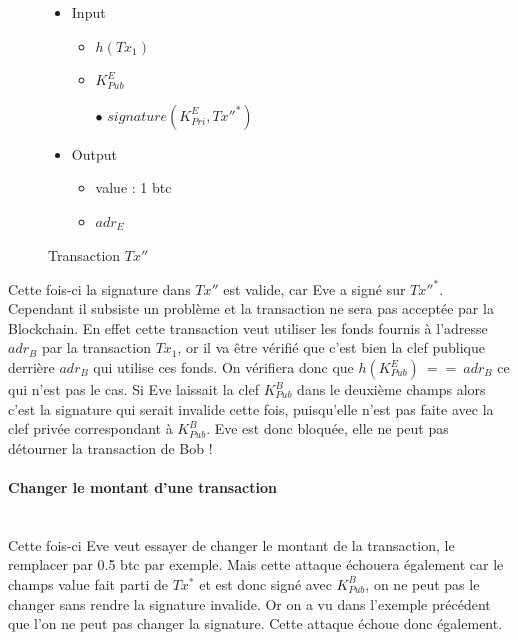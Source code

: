 \documentclass[11pt,a4paper]{article}
\begin{document}
\begin{figure}[H]
\begin{itemize}
\renewcommand{\labelitemi}{$\bullet$}
\renewcommand{\labelitemii}{$\star$}

\item Input
\begin{itemize}
\item $h(Tx_1)$
\item $K_{Pub}^{E}$
\item[$\bullet$] $signature(K_{Pri}^{E}, Tx''^*)$
\end{itemize}

\item Output
\begin{itemize}
\item value : 1 btc
\item $adr_E$
\end{itemize}

\end{itemize}

\caption{Transaction $Tx''$}
\end{figure}

Cette fois-ci la signature dans $Tx''$ est valide, car Eve a signé sur 
$Tx''^*$. Cependant il subsiste un problème et la transaction ne sera pas acceptée par la Blockchain. En effet cette transaction veut utiliser les fonds fournis à l'adresse $adr_B$ par la transaction $Tx_1$, or il va être vérifié que c'est bien la clef publique derrière $adr_B$ qui utilise ces fonds. On vérifiera donc que $h(K_{Pub}^{E}) ~==~ adr_B$ ce qui n'est pas le cas. Si Eve laissait la clef $K_{Pub}^{B}$ dans le deuxième champs alors c'est la signature qui serait invalide cette fois, puisqu'elle n'est pas faite avec la clef privée correspondant à $K_{Pub}^{B}$. Eve est donc bloquée, elle ne peut pas détourner la transaction de Bob !

\paragraph{Changer le montant d'une transaction\\\\}

Cette fois-ci Eve veut essayer de changer le montant de la transaction, le remplacer par 0.5 btc par exemple. Mais cette attaque échouera également car le champs value fait parti de $Tx^*$ et est donc signé avec $K_{Pub}^B$, on ne peut pas le changer sans rendre la signature invalide. Or on a vu dans l'exemple précédent que l'on ne peut pas changer la signature. Cette attaque échoue donc également.
\end{document}
